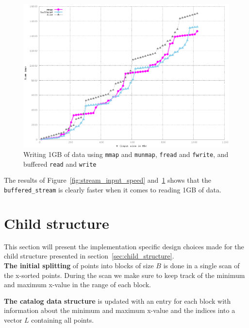 \documentclass[twoside,11pt,openright]{report}
\begin{document}
\begin{figure}
  \centering
  \includegraphics[width=\linewidth]{../src/experiments/stream_output_speed_experiment_results/2016-04-23.11_09_02/timems}
  \caption{Writing 1GB of data using \texttt{mmap} and \texttt{munmap}, \texttt{fread} and \texttt{fwrite}, and buffered \texttt{read} and \texttt{write}}
  \label{fig:stream_output_speed}
\end{figure}

The results of Figure~\ref{fig:stream_input_speed} and~\ref{fig:stream_output_speed} shows that the \texttt{buffered\_stream} is clearly faster when it comes to reading 1GB of data.



\section{Child structure}
This section will present the implementation specific design choices made for the child structure presented in section~\ref{sec:child_structure}. \\

\textbf{The initial splitting} of points into blocks of size $B$ is done in a single scan of the x-sorted points. During the scan we make sure to keep track of the minimum and maximum x-value in the range of each block.

\textbf{The catalog data structure} is updated with an entry for each block with information about the minimum and maximum x-value and the indices into a vector $L$ containing all points.
\end{document}
